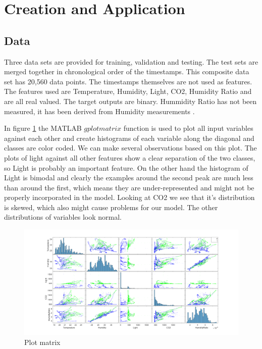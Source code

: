 \documentclass[a4paper, 11pt]{article}
\begin{document}
\section{Creation and Application}

\subsection{Data}
Three data sets are provided for training, validation and testing. The test sets are merged together in chronological order of the timestamps. This composite data set has 20,560 data points. The timestamps themselves are not used as features. The features used are Temperature, Humidity, Light, CO2, Humidity Ratio and are all real valued. The target outputs are binary. Hummidity Ratio has not been measured, it has been derived from Humidity measurements \cite{Candanedo2016}.


In figure \ref{fig:plotmatrix} the MATLAB $gplotmatrix$ function is used to plot all input variables against each other and create histograms of each variable along the diagonal and classes are color coded. We can make several observations based on this plot. The plots of light against all other features show a clear separation of the two classes, so Light is probably an important feature. On the other hand the histogram of Light is bimodal and clearly the examples around the second peak are much less than around the first, which means they are under-represented and might not be properly incorporated in the model. Looking at CO2 we see that it's distribution is skewed, which also might cause problems for our model. The other distributions of variables look normal. 

\begin{figure}[h]
  \centering
    \includegraphics[width=1\textwidth]{../figures/plotmatrix.png}
	\caption{Plot matrix}    
    \label{fig:plotmatrix}
\end{figure}
\end{document}
